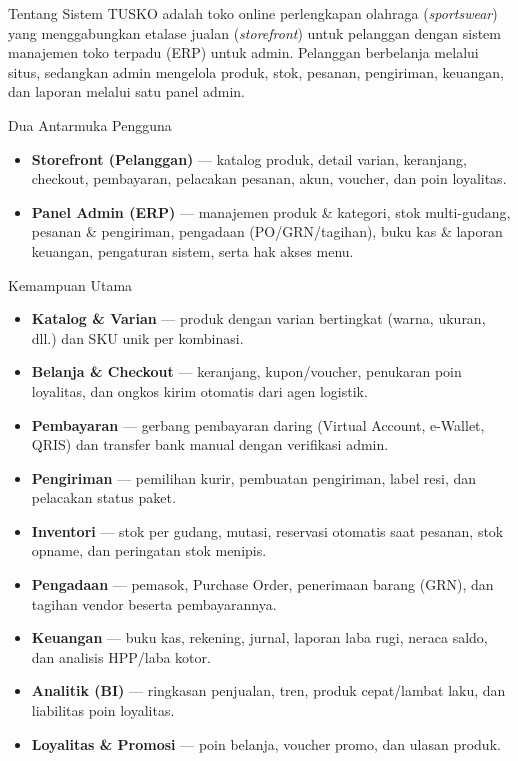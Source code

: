 
\begin{flowsection}{Tentang Sistem}
TUSKO adalah toko online perlengkapan olahraga (\emph{sportswear}) yang
menggabungkan etalase jualan (\emph{storefront}) untuk pelanggan dengan sistem
manajemen toko terpadu (ERP) untuk admin. Pelanggan berbelanja melalui situs,
sedangkan admin mengelola produk, stok, pesanan, pengiriman, keuangan, dan
laporan melalui satu panel admin.
\end{flowsection}

\begin{flowsection}{Dua Antarmuka Pengguna}
\begin{itemize}
  \item \textbf{Storefront (Pelanggan)} --- katalog produk, detail varian,
        keranjang, checkout, pembayaran, pelacakan pesanan, akun, voucher,
        dan poin loyalitas.
  \item \textbf{Panel Admin (ERP)} --- manajemen produk \& kategori, stok
        multi-gudang, pesanan \& pengiriman, pengadaan (PO/GRN/tagihan),
        buku kas \& laporan keuangan, pengaturan sistem, serta hak akses menu.
\end{itemize}
\end{flowsection}

\begin{flowsection}{Kemampuan Utama}
\begin{itemize}
  \item \textbf{Katalog \& Varian} --- produk dengan varian bertingkat
        (warna, ukuran, dll.) dan SKU unik per kombinasi.
  \item \textbf{Belanja \& Checkout} --- keranjang, kupon/voucher, penukaran
        poin loyalitas, dan ongkos kirim otomatis dari agen logistik.
  \item \textbf{Pembayaran} --- gerbang pembayaran daring (Virtual Account,
        e-Wallet, QRIS) dan transfer bank manual dengan verifikasi admin.
  \item \textbf{Pengiriman} --- pemilihan kurir, pembuatan pengiriman,
        label resi, dan pelacakan status paket.
  \item \textbf{Inventori} --- stok per gudang, mutasi, reservasi otomatis saat
        pesanan, stok opname, dan peringatan stok menipis.
  \item \textbf{Pengadaan} --- pemasok, Purchase Order, penerimaan barang (GRN),
        dan tagihan vendor beserta pembayarannya.
  \item \textbf{Keuangan} --- buku kas, rekening, jurnal, laporan laba rugi,
        neraca saldo, dan analisis HPP/laba kotor.
  \item \textbf{Analitik (BI)} --- ringkasan penjualan, tren, produk cepat/lambat
        laku, dan liabilitas poin loyalitas.
  \item \textbf{Loyalitas \& Promosi} --- poin belanja, voucher promo, dan
        ulasan produk.
\end{itemize}
\end{flowsection}

